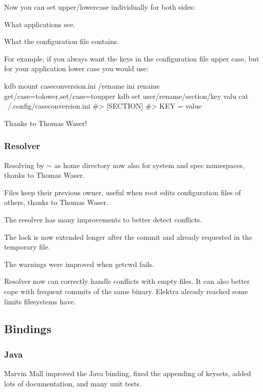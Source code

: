 Now you can set upper/lowercase individually for both sides\+:


\begin{DoxyEnumerate}
\item What applications see.
\item What the configuration file contains.
\end{DoxyEnumerate}

For example, if you always want the keys in the configuration file upper case, but for your application lower case you would use\+:


\begin{DoxyCode}
kdb mount caseconversion.ini /rename ini rename get/case=tolower,set/case=toupper
kdb set user/rename/section/key valu
cat ~/.config/caseconversion.ini
#> [SECTION]
#> KEY = value
\end{DoxyCode}


Thanks to Thomas Waser!

\subsubsection*{Resolver}

Resolving by $\sim$ as home directory now also for system and spec namespaces, thanks to Thomas Waser.

Files keep their previous owner, useful when root edits configuration files of others, thanks to Thomas Waser.

The resolver has many improvements to better detect conflicts.

The lock is now extended longer after the commit and already requested in the temporary file.

The warnings were improved when {\ttfamily getcwd} fails.

Resolver now can correctly handle conflicts with empty files. It can also better cope with frequent commits of the same binary. Elektra already reached some limits filesystems have.

\subsection*{Bindings}

\subsubsection*{Java}

Marvin Mall improved the Java binding, fixed the appending of keysets, added lots of documentation, and many unit tests.

